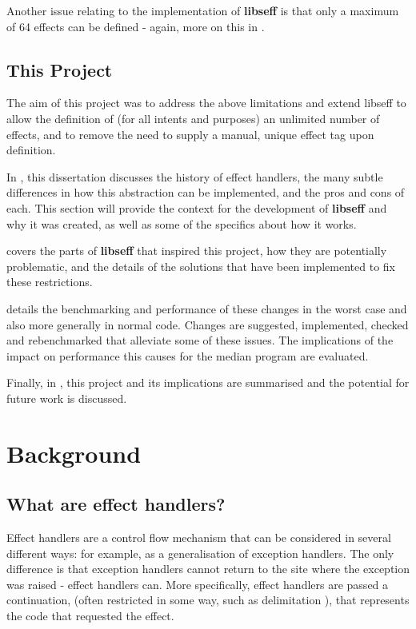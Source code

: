 \documentclass[logo,bsc,singlespacing,parskip,online]{infthesis}
\begin{document}
Another issue relating to the implementation of \textbf{libseff} is that only a maximum of 64 effects can be defined - again, more on this in .

\section{This Project}

The aim of this project was to address the above limitations and extend libseff to allow the definition of (for all intents and purposes) an unlimited number of effects, and to remove the need to supply a manual, unique effect tag upon definition.

In , this dissertation discusses the history of effect handlers, the many subtle differences in how this abstraction can be implemented, and the pros and cons of each. This section will provide the context for the development of \textbf{libseff} and why it was created, as well as some of the specifics about how it works.

 covers the parts of \textbf{libseff} that inspired this project, how they are potentially problematic, and the details of the solutions that have been implemented to fix these restrictions.

 details the benchmarking and performance of these changes in the worst case and also more generally in normal code. Changes are suggested, implemented, checked and rebenchmarked that alleviate some of these issues. The implications of the impact on performance this causes for the median program  are evaluated.

Finally, in , this project and its implications are summarised and the potential for future work is discussed.





\chapter{Background} \label{background}

\section{What are effect handlers?}
Effect handlers are a control flow mechanism that can be considered in several different ways: for example, as a generalisation of exception handlers. \citep{sep-log} The only difference is that exception handlers cannot return to the site where the exception was raised - effect handlers can. More specifically, effect handlers are passed a continuation, (often restricted in some way, such as delimitation \citep{old-paper}), that represents the code that requested the effect.
\end{document}
